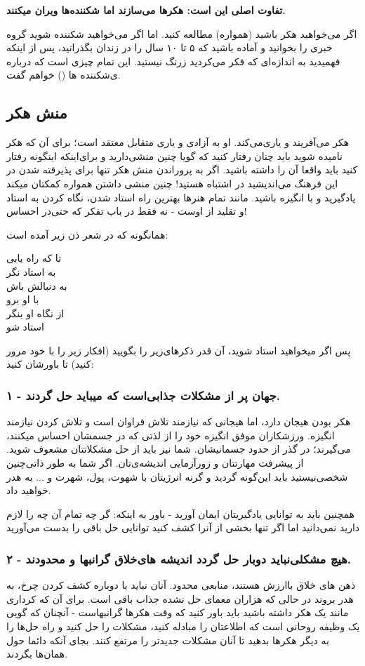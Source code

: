 \textbf{تفاوت اصلی این است: هکرها می‌سازند اما شکننده‌ها ویران میکنند.}

اگر می‌خواهید هکر باشید (همواره) مطالعه کنید. اما اگر می‌خواهید شکننده شوید گروه خبری‌
\href{news://alt.2600/}{}
را بخوانید و آماده باشید که ۵ تا ۱۰ سال را در زندان بگذرانید، پس از اینکه فهمیدید به اندازه‌ای که فکر می‌کردید زرنگ نیستید. این تمام چیزی است که درباره ی‌شکننده ها () خواهم گفت.
\subsection*{منش هکر}
هکر می‌آفریند و یاری‌می‌کند. او به آزادی و یاری متقابل معتقد است؛ برای آن که هکر نامیده شوید باید چنان رفتار کنید که گویا چنین منشی‌دارید و برای‌اینکه اینگونه رفتار کنید باید واقعا آن را داشته باشید. اگر به پروراندن منش هکر تنها برای پذیرفته شدن در این فرهنگ می‌اندیشید در اشتباه هستید! چنین منشی داشتن همواره کمکتان میکند یادگیرید و با انگیزه باشید. مانند تمام هنرها بهترین راه استاد شدن، نگاه کردن به استاد و تقلید از اوست - نه فقط در باب تفکر که حتی‌در احساس!

همانگونه که در شعر ذن زیر آمده است:
\begin{mdframed}
تا که راه یابی
\\
به استاد نگر
\\
به دنبالش باش
\\
با او برو
\\
از نگاه او بنگر
\\
استاد شو
\end{mdframed}
پس اگر میخواهید استاد شوید، آن قدر ذکرهای‌زیر را بگویید (افکار زیر را با خود مرور کنید) تا باورشان کنید:
\subsubsection*{۱ - جهان پر از مشکلات جذابی‌است که میباید حل گردند.}
هکر بودن هیجان دارد، اما هیجانی که نیازمند تلاش فراوان است و تلاش کردن نیازمند انگیزه. ورزشکاران موفق انگیزه خود را از لذتی که در جسمشان احساس میکنند، می‌گیرند؛ در گذر از حدود جسمانیشان. شما نیز باید از حل مشکلاتتان مشعوف شوید. از پیشرفت مهارتتان و زورآزمایی اندیشه‌ی‌تان.
اگر شما به طور ذاتی‌چنین شخصی‌نیستید باید این‌گونه گردید و گرنه انرژیتان با شهوت، پول، شهرت و ... به هدر خواهید داد.

همچنین باید به توانایی یادگیریتان ایمان آورید - باور به اینکه: گر چه تمام آن چه را لازم دارید نمی‌دانید اما اگر تنها بخشی از آنرا کشف کنید توانایی حل باقی را بدست می‌آورید
\subsubsection*{۲ - هیچ مشکلی‌نباید دوبار حل گردد اندیشه های‌خلاق گرانبها و محدودند.}
ذهن های خلاق باارزش هستند، منابعی محدود. آنان نباید با دوباره کشف کردن چرخ، به هدر بروند در حالی که هزاران معمای حل نشده جذاب باقی است. برای آن که کرداری مانند یک هکر داشته باشید باید باور کنید که وقت هکرها گرانبهاست - آنچنان که گویی یک وظیفه روحانی است که اطلاعتان را مبادله کنید، مشکلات را حل کنید و راه حل‌ها را به دیگر هکرها بدهید تا آنان مشکلات جدیدتر را مرتفع کنند. بجای آنکه دائما حول همان‌ها بگردند.

